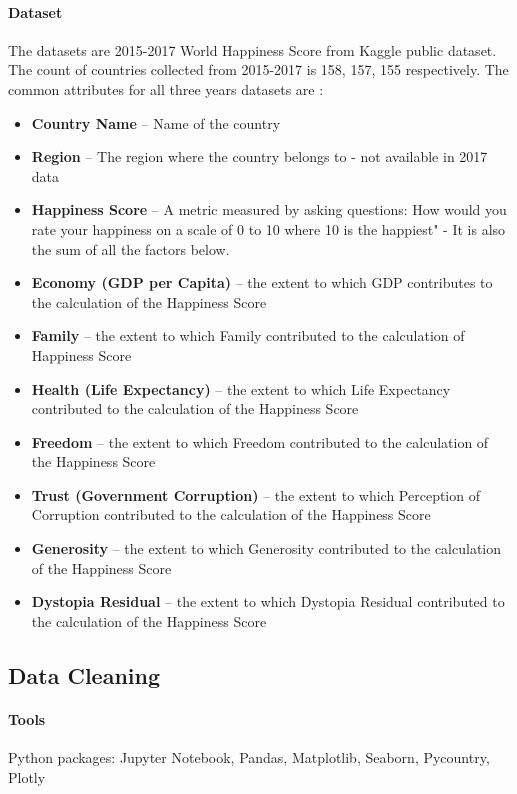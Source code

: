 \documentclass[11pt,twocolumn]{article}
\begin{document}
\paragraph{Dataset}
The datasets are 2015-2017 World Happiness Score from Kaggle public dataset. The count of countries collected from 2015-2017 is 158, 157, 155 respectively. The common attributes for all three years datasets are \cite{kaggle-dataset}:
\begin{itemize}
\item \textbf{Country Name} – Name of the country
\item \textbf{Region} – The region where the country belongs to - not available in 2017 data
\item \textbf{Happiness Score} – A metric measured by asking questions: How would you rate your happiness on a scale of 0 to 10 where 10 is the happiest" - It is also the sum of all the factors below.
\item \textbf{Economy (GDP per Capita)} – the extent to which GDP contributes to the calculation of the Happiness Score   
\item \textbf{Family} – the extent to which Family contributed to the calculation of Happiness Score
\item \textbf{Health (Life Expectancy)} – the extent to which Life Expectancy contributed to the calculation of the Happiness Score
\item \textbf{Freedom} – the extent to which Freedom contributed to the calculation of the Happiness Score
\item \textbf{Trust (Government Corruption)} – the extent to which Perception of Corruption contributed to the calculation of the Happiness Score
\item \textbf{Generosity} – the extent to which Generosity contributed to the calculation of the Happiness Score
\item \textbf{Dystopia Residual} – the extent to which Dystopia Residual contributed to the calculation of the Happiness Score
\end{itemize}

\subsection{Data Cleaning}

\paragraph{Tools} Python packages: Jupyter Notebook, Pandas, Matplotlib, Seaborn, Pycountry, Plotly
\end{document}
